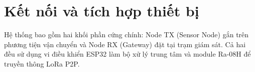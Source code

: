 

\section{Kết nối và tích hợp thiết bị}

Hệ thống bao gồm hai khối phần cứng chính: Node TX (Sensor Node) gắn trên phương tiện vận chuyển và Node RX (Gateway) đặt tại trạm giám sát. Cả hai đều sử dụng vi điều khiển ESP32 làm bộ xử lý trung tâm và module Ra-08H để truyền thông LoRa P2P.

